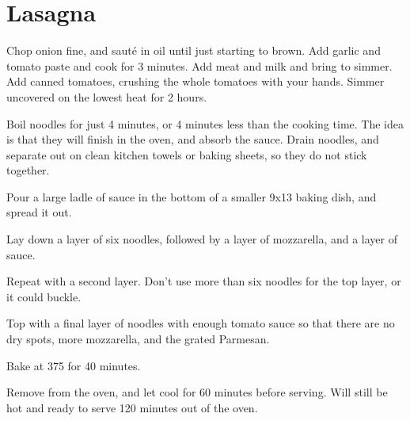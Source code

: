 \section{Lasagna}

\begin{recipe}



Chop onion fine, and sauté in oil until just starting to brown. Add garlic and tomato paste and cook for 3 minutes.
Add meat and milk and bring to simmer. Add canned tomatoes, crushing the whole tomatoes with your hands. 
Simmer uncovered on the lowest heat for 2 hours.


Boil noodles for just 4 minutes, or 4 minutes less than the cooking time. The idea is that they will finish in the oven,
and absorb the sauce. Drain noodles, and separate out on clean kitchen towels or baking sheets, so they do not stick together.

Pour a large ladle of sauce in the bottom of a smaller 9x13 baking dish, and spread it out.

Lay down a layer of six noodles, followed by a layer of mozzarella, and a layer of sauce.

Repeat with a second layer. Don't use more than six noodles for the top layer, or it could buckle. 


Top with a final layer of noodles with enough tomato sauce so that there are no dry spots, more mozzarella, and the grated Parmesan.

Bake at 375\degree{} for 40 minutes.

Remove from the oven, and let cool for 60 minutes before serving. Will still be hot and ready to serve 120 minutes out of the oven. 

\end{recipe}
